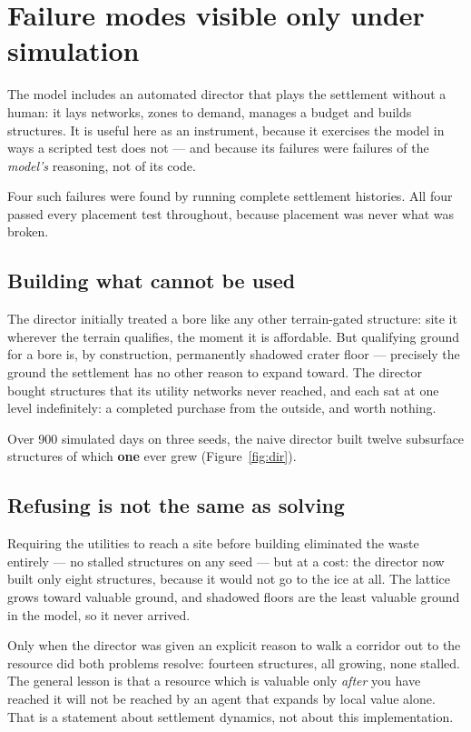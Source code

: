 \section{Failure modes visible only under simulation}
\label{sec:failures}

The model includes an automated director that plays the settlement without a
human: it lays networks, zones to demand, manages a budget and builds
structures. It is useful here as an instrument, because it exercises the model
in ways a scripted test does not --- and because its failures were failures of
the \emph{model's} reasoning, not of its code.

Four such failures were found by running complete settlement histories. All
four passed every placement test throughout, because placement was never what
was broken.

\subsection{Building what cannot be used}

The director initially treated a bore like any other terrain-gated structure:
site it wherever the terrain qualifies, the moment it is affordable. But
qualifying ground for a bore is, by construction, permanently shadowed crater
floor --- precisely the ground the settlement has no other reason to expand
toward. The director bought structures that its utility networks never reached,
and each sat at one level indefinitely: a completed purchase from the outside,
and worth nothing.

Over 900 simulated days on three seeds, the naive director built twelve
subsurface structures of which \textbf{one} ever grew (Figure~\ref{fig:dir}).

\subsection{Refusing is not the same as solving}

Requiring the utilities to reach a site before building eliminated the waste
entirely --- no stalled structures on any seed --- but at a cost: the director
now built only eight structures, because it would not go to the ice at all. The
lattice grows toward valuable ground, and shadowed floors are the least
valuable ground in the model, so it never arrived.

Only when the director was given an explicit reason to walk a corridor out to
the resource did both problems resolve: fourteen structures, all growing, none
stalled. The general lesson is that a resource which is valuable only
\emph{after} you have reached it will not be reached by an agent that expands
by local value alone. That is a statement about settlement dynamics, not about
this implementation.

